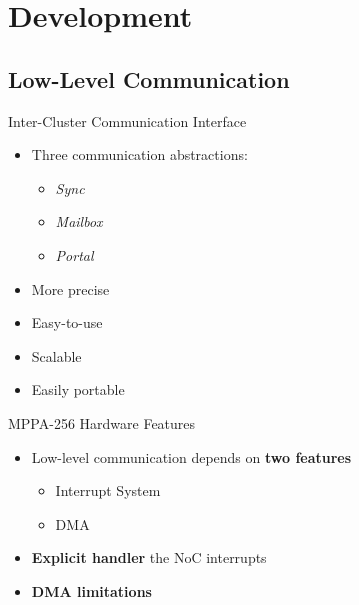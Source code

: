 \section{Development}

	\subsection{Low-Level Communication}

		\begin{frame}[fragile]{Inter-Cluster Communication Interface}

			\begin{itemize}
				\item Three communication abstractions:
				\begin{itemize}
					\item \textit{Sync}
					\item \textit{Mailbox}
					\item \textit{Portal}
				\end{itemize}
				\item More precise
				\item Easy-to-use
				\item Scalable
				\item Easily portable
			\end{itemize}


		\end{frame}

		\begin{frame}[fragile]{MPPA-256 Hardware Features}
			\begin{itemize}
				\item Low-level communication depends on \textbf{two features}
				\begin{itemize}
					\item Interrupt System
					\item DMA
				\end{itemize}
				\item \textbf{Explicit handler} the NoC interrupts %
				\item \textbf{DMA limitations}
			\end{itemize}

		\end{frame}

